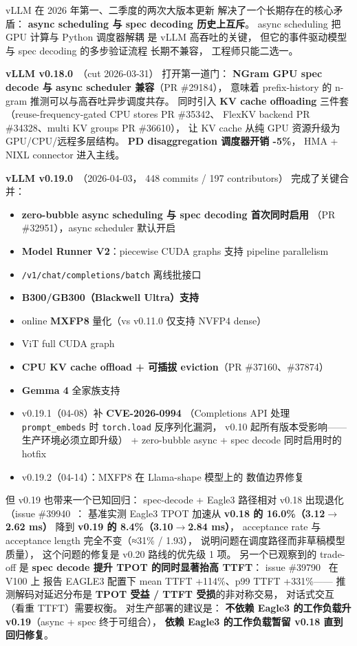 vLLM 在 2026 年第一、二季度的两次大版本更新
解决了一个长期存在的核心矛盾：
\textbf{async scheduling 与 spec decoding 历史上互斥}。
async scheduling 把 GPU 计算与 Python 调度器解耦
是 vLLM 高吞吐的关键，
但它的事件驱动模型与 spec decoding 的多步验证流程
长期不兼容，
工程师只能二选一。

\textbf{vLLM v0.18.0}~\cite{vllm018}（cut 2026-03-31）
打开第一道门：
\textbf{NGram GPU spec decode 与 async scheduler 兼容}（PR \#29184），
意味着 prefix-history 的 n-gram 推测可以与高吞吐异步调度共存。
同时引入 \textbf{KV cache offloading} 三件套
（reuse-frequency-gated CPU stores PR \#35342、
FlexKV backend PR \#34328、multi KV groups PR \#36610），
让 KV cache 从纯 GPU 资源升级为
GPU/CPU/远程多层结构。
\textbf{PD disaggregation 调度器开销 -5\%}，
HMA + NIXL connector 进入主线。

\textbf{vLLM v0.19.0}~\cite{vllm019}（2026-04-03，
448 commits / 197 contributors）
完成了关键合并：
\begin{itemize}[noitemsep]
  \item \textbf{zero-bubble async scheduling 与 spec decoding 首次同时启用}
        （PR \#32951），async scheduler 默认开启
  \item \textbf{Model Runner V2}：piecewise CUDA graphs 支持 pipeline parallelism
  \item \texttt{/v1/chat/completions/batch} 离线批接口
  \item \textbf{B300/GB300（Blackwell Ultra）支持}
  \item online \textbf{MXFP8} 量化（vs v0.11.0 仅支持 NVFP4 dense）
  \item ViT full CUDA graph
  \item \textbf{CPU KV cache offload + 可插拔 eviction}（PR \#37160、\#37874）
  \item \textbf{Gemma 4} 全家族支持
  \item v0.19.1（04-08）补 \textbf{CVE-2026-0994}
        （Completions API 处理 \texttt{prompt\_embeds} 时
        \texttt{torch.load} 反序列化漏洞，
        v0.10 起所有版本受影响——生产环境必须立即升级）
        + zero-bubble async + spec decode 同时启用时的 hotfix
  \item v0.19.2（04-14）：MXFP8 在 Llama-shape 模型上的
        数值边界修复
\end{itemize}

但 v0.19 也带来一个已知回归：
spec-decode + Eagle3 路径相对 v0.18 出现退化
（issue \#39940~\cite{vllm_eagle3_regression}：
基准实测 Eagle3 TPOT 加速从 \textbf{v0.18 的 16.0\%（3.12$\to$2.62 ms）}
降到 \textbf{v0.19 的 8.4\%（3.10$\to$2.84 ms）}，
acceptance rate 与 acceptance length 完全不变（≈31\% / 1.93），
说明问题在调度路径而非草稿模型质量），
这个问题的修复是 v0.20 路线的优先级 1 项。
另一个已观察到的 trade-off 是
\textbf{spec decode 提升 TPOT 的同时显著抬高 TTFT}：
issue \#39790~\cite{vllm_ttft_regression} 在 V100 上
报告 EAGLE3 配置下 mean TTFT +114\%、p99 TTFT +331\%——
推测解码对延迟分布是
\textbf{TPOT 受益 / TTFT 受损}的非对称交易，
对话式交互（看重 TTFT）需要权衡。
对生产部署的建议是：
\textbf{不依赖 Eagle3 的工作负载升 v0.19}（async + spec 终于可组合），
\textbf{依赖 Eagle3 的工作负载暂留 v0.18 直到回归修复}。

